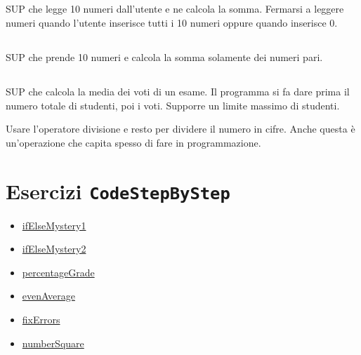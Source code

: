 \documentclass{article}
\begin{document}
\subsection{}
SUP che legge 10 numeri dall'utente e ne calcola la somma. Fermarsi a leggere numeri quando l'utente inserisce tutti i 10 numeri oppure quando inserisce 0.

\subsection{}
SUP che prende 10 numeri e calcola la somma solamente dei numeri pari.

\subsection{}
SUP che calcola la media dei voti di un esame. Il programma si fa dare prima il numero totale di studenti, poi i voti. Supporre un limite massimo di studenti. 

\begin{info} 
	Usare l'operatore divisione e resto per dividere il numero in cifre. Anche questa è un'operazione che capita spesso di fare in programmazione.
\end{info}


\section*{Esercizi \texttt{CodeStepByStep}}
\begin{itemize}
	\item \href{https://www.codestepbystep.com/problem/view/cpp/ifelse/ifElseMystery1}{ifElseMystery1}
	\item \href{https://www.codestepbystep.com/problem/view/cpp/ifelse/ifElseMystery2}{ifElseMystery2}
	\item \href{https://www.codestepbystep.com/problem/view/cpp/ifelse/percentageGrade}{percentageGrade}
	\item \href{https://www.codestepbystep.com/problem/view/cpp/basics/evenAverage}{evenAverage}
	\item \href{https://www.codestepbystep.com/problem/view/cpp/basics/fixErrors}{fixErrors}
	\item \href{https://www.codestepbystep.com/problem/view/cpp/basics/numberSquare}{numberSquare}
\end{itemize}
\end{document}
